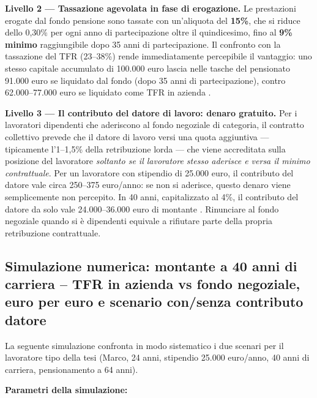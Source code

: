 \medskip
\noindent
\textbf{Livello 2 — Tassazione agevolata in fase di erogazione.}
Le prestazioni erogate dal fondo pensione sono tassate con un'aliquota
del \textbf{15\%}, che si riduce dello 0,30\% per ogni anno di
partecipazione oltre il quindicesimo, fino al \textbf{9\% minimo}
raggiungibile dopo 35 anni di partecipazione.
Il confronto con la tassazione del TFR (23--38\%) rende immediatamente
percepibile il vantaggio: uno stesso capitale accumulato di 100.000 euro
lascia nelle tasche del pensionato 91.000 euro se liquidato dal fondo
(dopo 35 anni di partecipazione), contro 62.000--77.000 euro se liquidato
come TFR in azienda \cite{web:78}.

\medskip
\noindent
\textbf{Livello 3 — Il contributo del datore di lavoro: denaro gratuito.}
Per i lavoratori dipendenti che aderiscono al fondo negoziale
di categoria, il contratto collettivo prevede che il datore di lavoro
versi una quota aggiuntiva — tipicamente l'1--1,5\% della retribuzione lorda —
che viene accreditata sulla posizione del lavoratore
\emph{soltanto se il lavoratore stesso aderisce e versa il minimo contrattuale}.
Per un lavoratore con stipendio di 25.000 euro, il contributo del datore
vale circa 250--375 euro/anno: se non si aderisce, questo denaro
viene semplicemente non percepito.
In 40 anni, capitalizzato al 4\%, il contributo del datore da solo
vale 24.000--36.000 euro di montante \cite{COVIP2025}.
Rinunciare al fondo negoziale quando si è dipendenti equivale a
rifiutare parte della propria retribuzione contrattuale.

\subsection{Simulazione numerica: montante a 40 anni di carriera --
            TFR in azienda vs fondo negoziale, euro per euro
            e scenario con/senza contributo datore}
\label{sub:simulazione}

\noindent
La seguente simulazione confronta in modo sistematico i due scenari
per il lavoratore tipo della tesi (Marco, 24 anni, stipendio 25.000
euro/anno, 40 anni di carriera, pensionamento a 64 anni).

\medskip
\noindent\textbf{Parametri della simulazione:}

